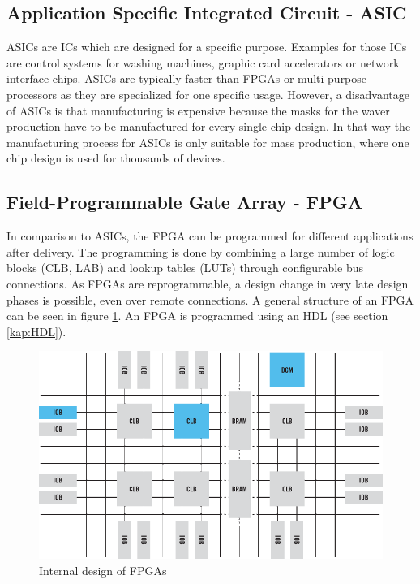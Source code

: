 \subsection{Application Specific Integrated Circuit - ASIC}
ASICs are ICs which are designed for a specific purpose. Examples for those ICs are control systems for washing machines, graphic card accelerators or network interface chips. ASICs are typically faster than FPGAs or multi purpose processors as they are specialized for one specific usage. However, a disadvantage of ASICs is that manufacturing is expensive because the masks for the waver production have to be manufactured for every single chip design. In that way the manufacturing process for ASICs is only suitable for mass production, where one chip design is used for thousands of devices.
\subsection{Field-Programmable Gate Array - FPGA}
In comparison to ASICs, the FPGA can be programmed for different applications after delivery. The programming is done by combining a large number of logic blocks (CLB, LAB) and lookup tables (LUTs) through configurable bus connections. As FPGAs are reprogrammable, a design change in very late design phases is possible, even over remote connections. A general structure of an FPGA can be seen in figure \ref{fig:fpgablocksgeneral}. An FPGA is programmed using an HDL (see section \ref{kap:HDL}).
\begin{figure}[htbp]
\begin{center}
\includegraphics[width=14cm,keepaspectratio=true]{bilder/png/fpgablocksgeneral}
\caption{Internal design of FPGAs}
\label{fig:fpgablocksgeneral}
\end{center}
\end{figure}
